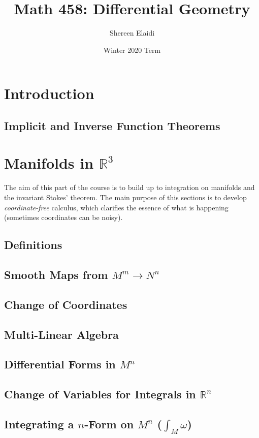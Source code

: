 \documentclass[11pt]{scrartcl}
\title{\textbf{Math 458: Differential Geometry}}
\author{Shereen Elaidi}
\date{Winter 2020 Term}
\newcommand{\R}[0]{\mathbb{R}}
\theoremstyle{definition}
\theoremstyle{remark}
\newcommand{\idx}[2]{\int_{#1}^{#2}}
\begin{document}
\maketitle
\tableofcontents

\section{Introduction}
\subsection{Implicit and Inverse Function Theorems}

\section{Manifolds in $\R^3$}
The aim of this part of the course is to build up to integration on manifolds and the invariant Stokes' theorem. The main purpose of this sections is to develop \emph{coordinate-free} calculus, which clarifies the essence of what is happening (sometimes coordinates can be noisy). 
\subsection{Definitions}

\subsection{Smooth Maps from $M^m \rightarrow N^n$}

\subsection{Change of Coordinates}

\subsection{Multi-Linear Algebra}

\subsection{Differential Forms in $M^n$}

\subsection{Change of Variables for Integrals in $\R^n$}

\subsection{Integrating a $n$-Form on $M^n$ ($\idx{M}{} \omega$)} 
\end{document}
